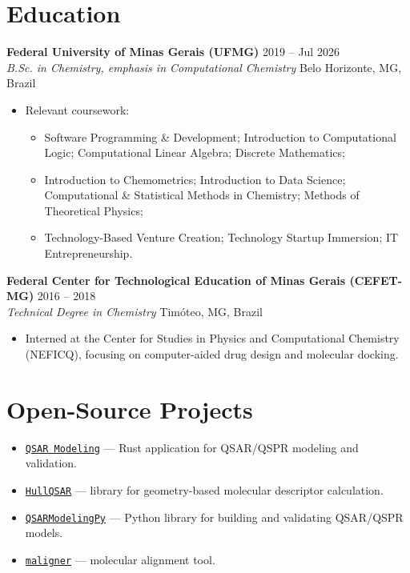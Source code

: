 \documentclass[10pt,a4paper]{article}
\newcommand{\entry}[4]{%
  \textbf{\sffamily\large #1} \hfill #2 \\
  {\itshape #3} \hfill {\small #4} \\[-0.75em]
}
\newcommand*{\link}[2]{\href{#1}{{\texttt{#2}}}}
\begin{document}
\section*{Education}
\entry{Federal University of Minas Gerais (UFMG)}{2019 -- Jul 2026}{B.Sc. in Chemistry, emphasis in Computational Chemistry}{Belo Horizonte, MG, Brazil}
\begin{itemize}\footnotesize
  \item Relevant coursework:
  \begin{itemize}
      \item Software Programming \& Development; Introduction to Computational Logic; Computational Linear Algebra; Discrete Mathematics;
      \item Introduction to Chemometrics; Introduction to Data Science; Computational \& Statistical Methods in Chemistry; Methods of Theoretical Physics;
      \item Technology-Based Venture Creation; Technology Startup Immersion; IT Entrepreneurship.
    \end{itemize}
\end{itemize}

\vspace{0.5em}

\entry{Federal Center for Technological Education of Minas Gerais (CEFET-MG)}{2016 -- 2018}{Technical Degree in Chemistry}{Timóteo, MG, Brazil}
\begin{itemize}\footnotesize
  \item Interned at the Center for Studies in Physics and Computational Chemistry (NEFICQ), focusing on computer-aided drug design and molecular docking.
\end{itemize}

\section*{Open-Source Projects}
\begin{itemize}
  \item \link{https://github.com/lacc-ufmg/qsarmodeling}{QSAR Modeling} --- Rust application for QSAR/QSPR modeling and validation.
  \item \link{https://github.com/hellmrf/HullQSAR}{HullQSAR} --- library for geometry-based molecular descriptor calculation.
  \item \link{https://github.com/lacc-ufmg/QSARModelingPy}{QSARModelingPy} --- Python library for building and validating QSAR/QSPR models.
  \item \link{https://github.com/hellmrf/maligner}{maligner} --- molecular alignment tool.
\end{itemize}
\end{document}
